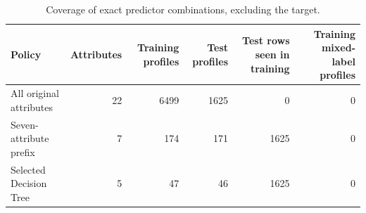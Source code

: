 \begin{table}[H]
\centering\small
\caption{Coverage of exact predictor combinations, excluding the target.}
\begin{tabular}{lrrrrr}
\toprule
Policy & Attributes & Training profiles & Test profiles & Test rows seen in training & Training mixed-label profiles \\
\midrule
All original attributes & 22 & 6499 & 1625 & 0 & 0 \\
Seven-attribute prefix & 7 & 174 & 171 & 1625 & 0 \\
Selected Decision Tree & 5 & 47 & 46 & 1625 & 0 \\
\bottomrule
\end{tabular}
\end{table}
